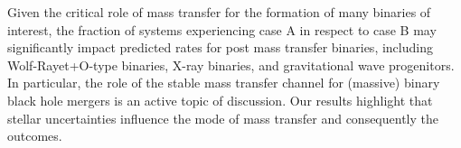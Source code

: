 \documentclass[twocolumn]{aastex63}
\begin{document}
Given the critical role of mass transfer for the formation of many
binaries of interest, the fraction of systems experiencing case A in
respect to case B may significantly impact predicted rates for post
mass transfer binaries, including Wolf-Rayet+O-type binaries, X-ray
binaries, and gravitational wave progenitors. In particular, the role
of the stable mass transfer channel \citep[e.g.,][]{marchant:21,
  vanson:22} for (massive) binary black hole mergers is an active
topic of discussion. Our results highlight that stellar uncertainties
influence the mode of mass transfer and consequently the outcomes.




\end{document}
